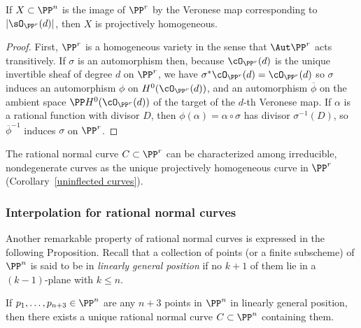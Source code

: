 \begin{proposition}\label{Veronese is projectively homogeneous}
If $X\subset \PP^n$ is the image of $\PP^r$ by the Veronese map corresponding to $|\sO_{\PP^r}(d)|$, then $X$ is projectively homogeneous.
\end{proposition}
\begin{proof}
First, $\PP^r$ is a homogeneous variety in the sense that $\Aut \PP^r$ acts transitively. If $\sigma$ is an automorphism then,
 because $\cO_{\PP^r}(d)$ is the unique
invertible sheaf of degree $d$ on $\PP^r$,  we have $\sigma^*\cO_{\PP^r}(d) = \cO_{\PP^r}(d)$ so $\sigma$ induces an automorphism $\phi$ on $H^0(\cO_{\PP^r}(d))$, and an automorphism $\overline \phi$ on the ambient space $\PP H^0(\cO_{\PP^r}(d))$ of the target of the $d$-th Veronese map. If $\alpha$
is a rational function with divisor $D$, then $\phi(\alpha) = \alpha\circ \sigma$ has divisor $\sigma^{-1}(D)$, so $\overline\phi^{-1}$ induces $\sigma$ on $\PP^r$. 
\end{proof}

The rational normal curve $C \subset \PP^r$ can  be characterized among irreducible, nondegenerate curves as the unique projectively homogeneous curve in $\PP^r$ (Corollary~\ref{uninflected curves}).

\subsubsection{Interpolation for rational normal curves}

Another remarkable property of rational normal curves is expressed in the following Proposition. Recall that a collection of points (or a finite subscheme)
of $\PP^n$ is said to be in \emph{linearly general position} if no $k+1$ of them lie in a $(k-1)$-plane with $k\leq n$. 

\begin{proposition}\label{points on rnc}
If $p_1,\dots, p_{n+3} \in \PP^n$ are any $n+3$ points in $\PP^n$ in linearly general position, then there exists a unique rational normal curve $C \subset \PP^n$ containing them.
 \end{proposition}

